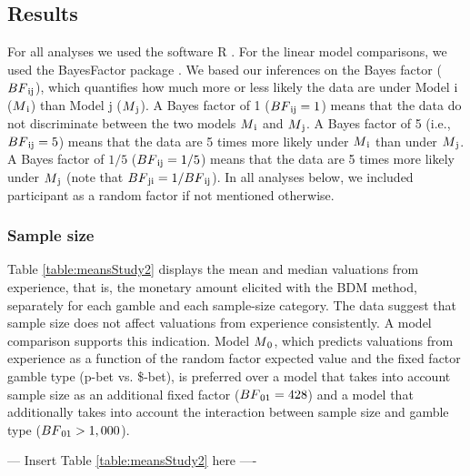\documentclass[a4paper,man, natbib]{apa6} %
\begin{document}
\subsection{Results}

For all analyses we used the software R \citep{R2014}. For the linear model comparisons, we used the BayesFactor package \citep{BayesFactor}. We based our inferences on the Bayes factor ($BF\textsubscript{ij}$), which quantifies how much more or less likely the data are under Model i ($M\textsubscript{i}$) than Model j ($M\textsubscript{j}$). A Bayes factor of 1 ($BF\textsubscript{ij} = 1$) means that the data do not discriminate between the two models $M\textsubscript{i}$ and $M\textsubscript{j}$. A Bayes factor of 5 (i.e., $BF\textsubscript{ij} = 5$) means that the data are 5 times more likely under $M\textsubscript{i}$ than under $M\textsubscript{j}$. A Bayes factor of $1/5$ ($BF\textsubscript{ij} = 1/5$) means that the data are 5 times more likely under $M\textsubscript{j}$ (note that $BF\textsubscript{ji} = 1/BF\textsubscript{ij}$). 
In all analyses below, we included participant as a random factor if not mentioned otherwise.



\subsubsection{Sample size}
Table \ref{table:meansStudy2} displays the mean and median valuations from experience, that is, the monetary amount elicited with the BDM method, separately for each gamble and each sample-size category. The data suggest that sample size does not affect valuations from experience consistently. A model comparison supports this indication. Model $M\textsubscript{0}$, which predicts valuations from experience as a function of the random factor expected value and the fixed factor gamble type (p-bet vs. \$-bet), is preferred over a model that takes into account sample size as an additional fixed factor ($BF\textsubscript{01} = 428$) and a model that additionally takes into account the interaction between sample size and gamble type ($BF\textsubscript{01} > 1,000$). 


\begin{center} --- Insert Table \ref{table:meansStudy2} here ---- \end{center}






\end{document}
